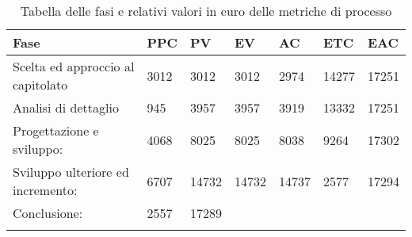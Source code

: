 

\begin{longtable}{f m m m m m m}  
 Fase 		  & PPC  & PV 	 & EV 	 & AC 	& ETC 	& EAC \\
\endhead

Scelta ed approccio al capitolato & 3012 & 3012  & 3012  & 2974  & 14277 & 17251 \\
\hline
Analisi di dettaglio 			  & 945  & 3957  & 3957  & 3919  & 13332 & 17251 \\
\hline
Progettazione e sviluppo:  		  & 4068 & 8025  & 8025  & 8038  & 9264  & 17302 \\
\hline
Sviluppo ulteriore ed incremento: & 6707 & 14732 & 14732 & 14737 & 2577  & 17294 \\
\hline
Conclusione:  			  		  & 2557 & 17289 & & & & \\
\hline


\bottomrule
\caption{Tabella delle fasi e relativi valori in euro delle metriche di processo}
\end{longtable}